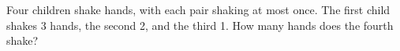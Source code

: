 Four children shake hands, with each pair shaking at most once. The first child shakes 3 hands, the second 2, and the third 1. How many hands does the fourth shake?
